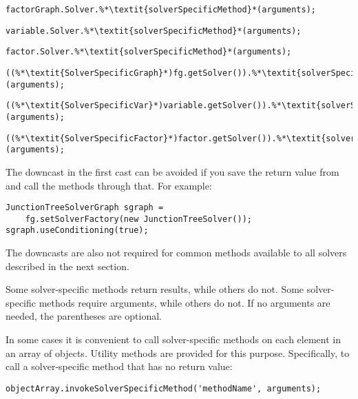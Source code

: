 \ifmatlab
\begin{lstlisting}
factorGraph.Solver.%*\textit{solverSpecificMethod}*(arguments);
\end{lstlisting}

\begin{lstlisting}
variable.Solver.%*\textit{solverSpecificMethod}*(arguments);
\end{lstlisting}

\begin{lstlisting}
factor.Solver.%*\textit{solverSpecificMethod}*(arguments);
\end{lstlisting}
\fi

\ifjava
\begin{lstlisting}
((%*\textit{SolverSpecificGraph}*)fg.getSolver()).%*\textit{solverSpecificMethod}*(arguments);
\end{lstlisting}

\begin{lstlisting}
((%*\textit{SolverSpecificVar}*)variable.getSolver()).%*\textit{solverSpecificMethod}*(arguments);
\end{lstlisting}

\begin{lstlisting}
((%*\textit{SolverSpecificFactor}*)factor.getSolver()).%*\textit{solverSpecificMethod}*(arguments);
\end{lstlisting}

The downcast in the first cast can be avoided if you save the return value from  and call the methods through that. For example:

\begin{lstlisting}
JunctionTreeSolverGraph sgraph =
    fg.setSolverFactory(new JunctionTreeSolver());
sgraph.useConditioning(true);
\end{lstlisting}

The downcasts are also not required for common methods available to all solvers described in the next section.
\fi

Some solver-specific methods return results, while others do not.  Some solver-specific methods require arguments, while others do not.  \ifmatlab If no arguments are needed, the parentheses are optional. \fi

\ifmatlab

In some cases it is convenient to call solver-specific methods on each element in an array of objects.  Utility methods are provided for this purpose.  Specifically, to call a solver-specific method that has no return value:
\begin{lstlisting}
objectArray.invokeSolverSpecificMethod('methodName', arguments);
\end{lstlisting}

